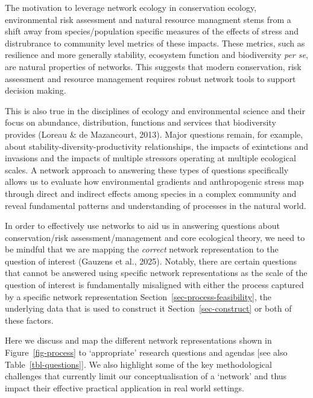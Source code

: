 \documentclass[
]{article}
\begin{document}
The motivation to leverage network ecology in conservation ecology,
environmental risk assessment and natural resource managment stems from
a shift away from species/population specific measures of the effects of
stress and distrubrance to community level metrics of these impacts.
These metrics, such as resilience and more generally stability,
ecosystem function and biodiversity \emph{per se}, are natural
properties of networks. This suggests that modern conservation, risk
assessment and resource management requires robust network tools to
support decision making.

This is also true in the disciplines of ecology and environmental
science and their focus on abundance, distribution, functions and
services that biodiversity provides (Loreau \& de Mazancourt, 2013).
Major questions remain, for example, about
stability-diversity-productivity relationships, the impacts of
exintctions and invasions and the impacts of multiple stressors
operating at multiple ecological scales. A network approach to answering
these types of questions specifically allows us to evaluate how
environmental gradients and anthropogenic stress map through direct and
indirect effects among species in a complex community and reveal
fundamental patterns and understanding of processes in the natural
world.

In order to effectively use networks to aid us in answering questions
about conservation/risk assessment/management and core ecological
theory, we need to be mindful that we are mapping the \emph{correct}
network representation to the question of interest (Gauzens et al.,
2025). Notably, there are certain questions that cannot be answered
using specific network representations as the scale of the question of
interest is fundamentally misaligned with either the process captured by
a specific network representation Section~\ref{sec-process-feasibility},
the underlying data that is used to construct it
Section~\ref{sec-construct} or both of these factors.

Here we discuss and map the different network representations shown in
Figure~\ref{fig-process} to `appropriate' research questions and agendas
{[}see also Table~\ref{tbl-questions}{]}. We also highlight some of the
key methodological challenges that currently limit our conceptualisation
of a `network' and thus impact their effective practical application in
real world settings.
\end{document}
